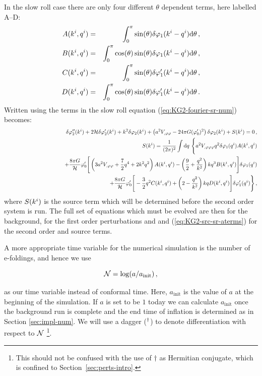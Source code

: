 In the slow roll case there are only four different $\theta$ dependent terms,
here labelled A--D:
%
\begin{eqnarray}
\label{eq:AtoD-num}
 A(k^i,q^i) &=& \int_0^\pi \sin(\theta) \delta\varphi_{1}(k^i-q^i) \mathrm{d}\theta \,,
\nonumber\\
 B(k^i,q^i) &=& \int_0^\pi \cos(\theta)\sin(\theta) \delta\varphi_{1}(k^i-q^i)
\mathrm{d}\theta \,,\nonumber\\
 C(k^i,q^i) &=& \int_0^\pi \sin(\theta) \delta\varphi_{1}'(k^i-q^i) \mathrm{d}\theta \,,
\nonumber\\
 D(k^i,q^i) &=& \int_0^\pi \cos(\theta) \sin(\theta) \delta\varphi_{1}'(k^i-q^i)
\mathrm{d}\theta \,.
\end{eqnarray}
%
Written using the terms in  the slow roll equation
(\ref{eq:KG2-fourier-sr-num}) becomes:
%
\begin{eqnarray}
\label{eq:KG2-fourier-sr-aterms}
&&\dvp2''(\kvi)+2\H\dvp2'(\kvi)+k^2\dvp2(\kvi)
+\left(a^2
\Upp-{24 \pi G}(\vp_{0}')^2\right)
\dvp2(\kvi)
+ S(\kvi) = 0 \,,\\
%
\label{eq:KG2-src-sr-aterms}
&&S(\kvi) = \frac{1}{(2\pi)^2}\int \d q\ \Bigg\{
a^2\Uppp q^2 \dvp1(\qvi) A(\kvi,\qvi) \nonumber\\
&& \qquad\qquad\qquad\qquad\qquad + \frac{8\pi G}{\H}\vp_{0}' \Bigg[ 
\left( 3a^2\Upp + \frac{7}{2}q^4 + 2k^2q^2\right) A(\kvi,\qvi)
-\left(\frac{9}{2} + \frac{q^2}{k^2}\right)kq^3 B(\kvi,\qvi)
\Bigg]\dvp1(\qvi) \nonumber\\
%
&&\qquad\qquad\qquad\qquad \qquad+ \frac{8\pi G}{\H}\vp_{0}' \Bigg[
-\frac{3}{2}q^2 C(\kvi,\qvi) + \left(2-\frac{q^2}{k^2}\right)kq D(\kvi,\qvi) 
\Bigg]\dvp1'(\qvi) \Bigg\} \,,
%
\end{eqnarray}
%
where $S(k^i)$ is the source term which will be determined before the
second order system is run. The full set of equations which must be evolved are
then  for the background,  for the first
order perturbations and  and
(\ref{eq:KG2-src-sr-aterms}) for the second order and source terms.


A more appropriate time variable for the numerical simulation is the
number of e-foldings, and hence we use 
%

\begin{equation}
\label{eq:def-ntime}
\mathcal{N} = \log ( a / a_{\mathrm{init}} )\,,
\end{equation}

%
as our time variable instead of conformal time. Here,
$a_{\mathrm{init}}$ is the value of $a$ at the beginning of the
simulation. If $a$ is set to be $1$ today we can calculate
$a_{\mathrm{init}}$ once the background run is complete and the end
time of inflation is determined as in Section
\ref{sec:impl-num}. We will use a dagger ($^{\dagger}$) to denote
differentiation with respect to $\mathcal{N}$ \footnote{This should not be confused
with the use of $\dagger$ as Hermitian conjugate, which is confined to
Section~\ref{sec:perts-intro}.}.


